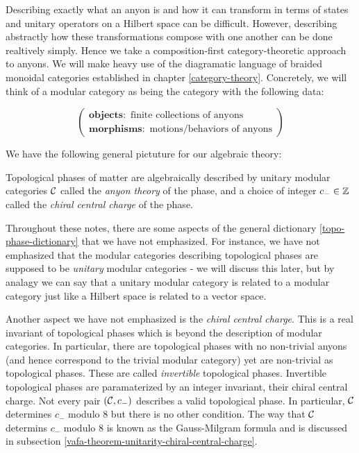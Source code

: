 Describing exactly what an anyon is and how it can transform in terms of states and unitary operators on a Hilbert space can be difficult. However, describing abstractly how these transformations compose with one another can be done realtively simply. Hence we take a composition-first category-theoretic approach to anyons. We will make heavy use of the diagramatic language of braided monoidal categories established in chapter \ref{category-theory}. Concretely, we will think of a modular category as being the category with the following data:

\begin{equation*}
\left(\substack{
\mathbf{objects:}\text{ finite collections of anyons}\\
\mathbf{morphisms:}\text{ motions/behaviors of anyons}
}\right)
\end{equation*}


We have the following general pictuture for our algebraic theory:

\begin{dict}\label{topo-phase-dictionary} Topological phases of matter are algebraically described by unitary modular categories ${\mathcal C}$ called the {\em anyon theory} of the phase, and a choice of integer $c_-\in {\mathbb Z}$ called the {\em chiral central charge} of the phase.
\end{dict}

\begin{rem} Throughout these notes, there are some aspects of the general dictionary \ref{topo-phase-dictionary} that we have not emphasized. For instance, we have not emphasized that the modular categories describing topological phases are supposed to be {\em unitary} modular categories - we will discuss this later, but by analagy we can say that a unitary modular category is related to a modular category just like a Hilbert space is related to a vector space.

Another aspect we have not emphasized is the {\em chiral central charge}. This is a real invariant of topological phases which is beyond the description of modular categories. In particular, there are topological phases with no non-trivial anyons (and hence correspond to the trivial modular category) yet are non-trivial as topological phases. These are called {\em invertible} topological phases. Invertible topological phases are paramaterized by an integer invariant, their chiral central charge. Not every pair $({\mathcal C},c_-)$ describes a valid topological phase. In particular, ${\mathcal C}$ determines $c_-$ modulo $8$ but there is no other condition. The way that ${\mathcal C}$ determins $c_-$ modulo $8$ is known as the Gauss-Milgram formula and is discussed in subsection \ref{vafa-theorem-unitarity-chiral-central-charge}. 
\end{rem}

